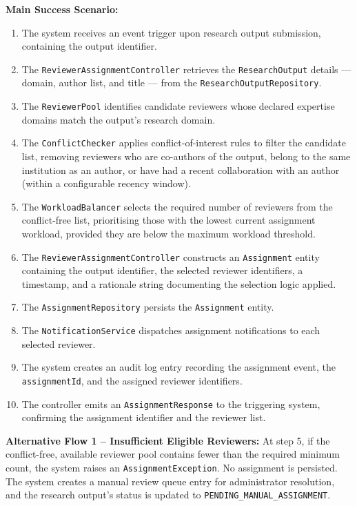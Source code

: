 \documentclass[12pt,a4paper]{article}
\newcommand{\code}[1]{\texttt{\small #1}}
\begin{document}
\textbf{Main Success Scenario:}

\begin{enumerate}
  \item The system receives an event trigger upon research output submission, containing the output identifier.
  \item The \code{ReviewerAssignmentController} retrieves the \code{ResearchOutput} details --- domain, author list, and title --- from the \code{ResearchOutputRepository}.
  \item The \code{ReviewerPool} identifies candidate reviewers whose declared expertise domains match the output's research domain.
  \item The \code{ConflictChecker} applies conflict-of-interest rules to filter the candidate list, removing reviewers who are co-authors of the output, belong to the same institution as an author, or have had a recent collaboration with an author (within a configurable recency window).
  \item The \code{WorkloadBalancer} selects the required number of reviewers from the conflict-free list, prioritising those with the lowest current assignment workload, provided they are below the maximum workload threshold.
  \item The \code{ReviewerAssignmentController} constructs an \code{Assignment} entity containing the output identifier, the selected reviewer identifiers, a timestamp, and a rationale string documenting the selection logic applied.
  \item The \code{AssignmentRepository} persists the \code{Assignment} entity.
  \item The \code{NotificationService} dispatches assignment notifications to each selected reviewer.
  \item The system creates an audit log entry recording the assignment event, the \code{assignmentId}, and the assigned reviewer identifiers.
  \item The controller emits an \code{AssignmentResponse} to the triggering system, confirming the assignment identifier and the reviewer list.
\end{enumerate}

\noindent\textbf{Alternative Flow 1 -- Insufficient Eligible Reviewers:}
At step 5, if the conflict-free, available reviewer pool contains fewer than the required minimum count, the system raises an \code{AssignmentException}. No assignment is persisted. The system creates a manual review queue entry for administrator resolution, and the research output's status is updated to \code{PENDING\_MANUAL\_ASSIGNMENT}.
\end{document}

